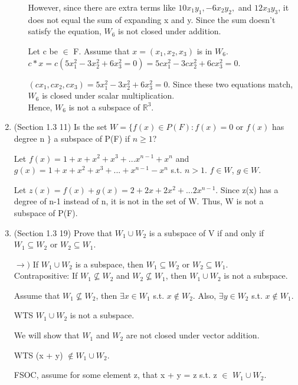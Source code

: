 \documentclass[12pt]{article}
\begin{document}
\begin{enumerate}
\begin{enumerate}[label=(\alph*)]
        However, since there are extra terms like $10x_1y_1, - 6x_2y_2,$ and $12x_3y_3$, it does not equal the sum of expanding x and y. Since the sum doesn't satisfy the equation, $W_6$ is not closed under addition. 

        Let c be $\in$ F. Assume that $x = (x_1, x_2, x_3)$ is in $W_6$. 
        $c * x = c(5x_1^2 - 3x_2^2 + 6x_3^2 = 0) = 5cx_1^2 - 3cx_2^2 + 6cx_3^2 = 0$. 

        $(cx_1, cx_2, cx_3) = 5x_1^2 - 3x_2^2 + 6x_3^2 = 0$. 
        Since these two equations match, $W_6$ is closed under scalar multiplication.\\

        Hence, $W_6$ is not a subspace of $\mathbb{R}^3$.
        
    \end{enumerate} 

    \item (Section 1.3 11)
    Is the set $W = \{ f(x) \in P(F): f(x) = 0 $ or $f(x) $ has degree n $ \}$ a subspace of P(F) if $ n \geq 1$?

    Let $f(x) = 1 + x + x^2 + x^3 + ... x^{n-1} + x^n$ and $g(x) = 1 + x + x^2 + x^3 + ... + x^{n-1} - x^n$ s.t. $n > 1$. $f \in W$, $g \in W$. 

    Let $z(x) = f(x) + g(x) = 2 + 2x + 2x^2 + ... 2x^{n-1}$. 
    Since z(x) has a degree of n-1 instead of n, it is not in the set of W. Thus, W is not a subspace of P(F). \\
    
    \item (Section 1.3 19)
    Prove that $W_1 \cup W_2$ is a subspace of V if and only if $W_1 \subseteq W_2$ or $W_2 \subseteq W_1$. 

    
    $\rightarrow)$ If $W_1 \cup W_2$ is a subspace, then $W_1 \subseteq W_2$ or $W_2 \subseteq W_1$. \\
    Contrapositive: If $W_1 \not \subseteq W_2$ and $W_2 \not \subseteq W_1$, then $W_1 \cup W_2$ is not a subspace.

    Assume that $W_1 \not \subseteq W_2$, then $\exists x \in W_1$ s.t. $x \not\in W_2$. Also, $\exists y \in W_2$ s.t. $x \not\in W_1$. 

    WTS $W_1 \cup W_2$ is not a subspace.

    We will show that $W_1$ and $W_2$ are not closed under vector addition.
    
    WTS (x + y) $\not\in W_1 \cup W_2$.

    FSOC, assume for some element z, that x + y = z s.t. z $\in$ $W_1 \cup W_2$.


\end{enumerate}
\end{document}

